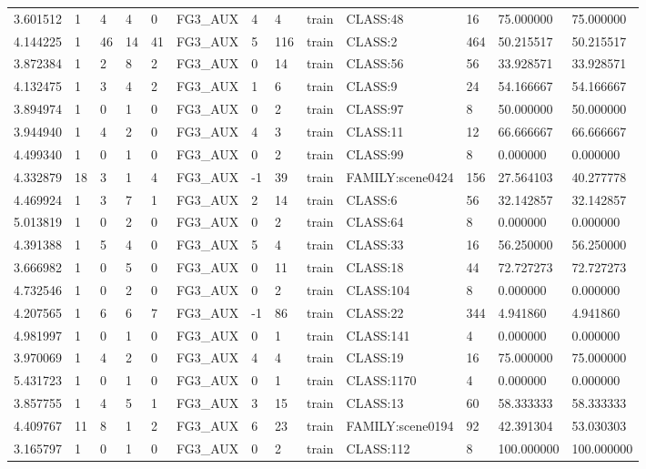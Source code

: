 \begin{tabular}{lllllllllllll}
3.601512 & 1 & 4 & 4 & 0 & FG3\_AUX & 4 & 4 & train & CLASS:48 & 16 & 75.000000 & 75.000000 \\
4.144225 & 1 & 46 & 14 & 41 & FG3\_AUX & 5 & 116 & train & CLASS:2 & 464 & 50.215517 & 50.215517 \\
3.872384 & 1 & 2 & 8 & 2 & FG3\_AUX & 0 & 14 & train & CLASS:56 & 56 & 33.928571 & 33.928571 \\
4.132475 & 1 & 3 & 4 & 2 & FG3\_AUX & 1 & 6 & train & CLASS:9 & 24 & 54.166667 & 54.166667 \\
3.894974 & 1 & 0 & 1 & 0 & FG3\_AUX & 0 & 2 & train & CLASS:97 & 8 & 50.000000 & 50.000000 \\
3.944940 & 1 & 4 & 2 & 0 & FG3\_AUX & 4 & 3 & train & CLASS:11 & 12 & 66.666667 & 66.666667 \\
4.499340 & 1 & 0 & 1 & 0 & FG3\_AUX & 0 & 2 & train & CLASS:99 & 8 & 0.000000 & 0.000000 \\
4.332879 & 18 & 3 & 1 & 4 & FG3\_AUX & -1 & 39 & train & FAMILY:scene0424 & 156 & 27.564103 & 40.277778 \\
4.469924 & 1 & 3 & 7 & 1 & FG3\_AUX & 2 & 14 & train & CLASS:6 & 56 & 32.142857 & 32.142857 \\
5.013819 & 1 & 0 & 2 & 0 & FG3\_AUX & 0 & 2 & train & CLASS:64 & 8 & 0.000000 & 0.000000 \\
4.391388 & 1 & 5 & 4 & 0 & FG3\_AUX & 5 & 4 & train & CLASS:33 & 16 & 56.250000 & 56.250000 \\
3.666982 & 1 & 0 & 5 & 0 & FG3\_AUX & 0 & 11 & train & CLASS:18 & 44 & 72.727273 & 72.727273 \\
4.732546 & 1 & 0 & 2 & 0 & FG3\_AUX & 0 & 2 & train & CLASS:104 & 8 & 0.000000 & 0.000000 \\
4.207565 & 1 & 6 & 6 & 7 & FG3\_AUX & -1 & 86 & train & CLASS:22 & 344 & 4.941860 & 4.941860 \\
4.981997 & 1 & 0 & 1 & 0 & FG3\_AUX & 0 & 1 & train & CLASS:141 & 4 & 0.000000 & 0.000000 \\
3.970069 & 1 & 4 & 2 & 0 & FG3\_AUX & 4 & 4 & train & CLASS:19 & 16 & 75.000000 & 75.000000 \\
5.431723 & 1 & 0 & 1 & 0 & FG3\_AUX & 0 & 1 & train & CLASS:1170 & 4 & 0.000000 & 0.000000 \\
3.857755 & 1 & 4 & 5 & 1 & FG3\_AUX & 3 & 15 & train & CLASS:13 & 60 & 58.333333 & 58.333333 \\
4.409767 & 11 & 8 & 1 & 2 & FG3\_AUX & 6 & 23 & train & FAMILY:scene0194 & 92 & 42.391304 & 53.030303 \\
3.165797 & 1 & 0 & 1 & 0 & FG3\_AUX & 0 & 2 & train & CLASS:112 & 8 & 100.000000 & 100.000000 \\

\end{tabular}
